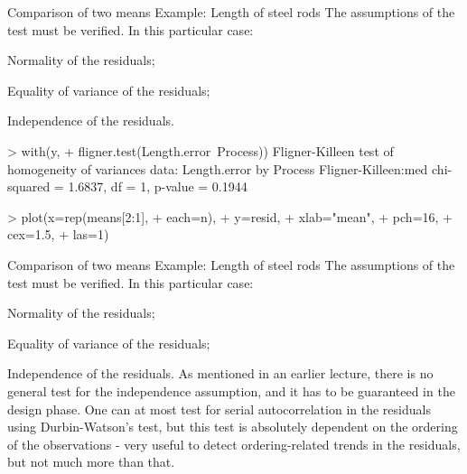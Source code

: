 \documentclass[t]{beamer}
\begin{document}
\begin{ftstf}
{Comparison of two means}
{Example: Length of steel rods}
The assumptions of the test must be verified. In this particular case:

\bitems Normality of the residuals;
\item \alert{Equality of variance of the residuals};
\item Independence of the residuals.
\eitem
\begin{rcode}
> with(y,
+      fligner.test(Length.error~Process))
Fligner-Killeen test of homogeneity of variances
data:  Length.error by Process
Fligner-Killeen:med chi-squared = 1.6837, 
df = 1, p-value = 0.1944

> plot(x=rep(means[2:1],
+            each=n),
+      y=resid,
+      xlab="mean",
+      pch=16,
+      cex=1.5,
+      las=1)
\end{rcode}
\end{ftstf}


\begin{ftst}
{Comparison of two means}
{Example: Length of steel rods}
The assumptions of the test must be verified. In this particular case:

\bitems Normality of the residuals;
\item Equality of variance of the residuals;
\item \alert{Independence of the residuals}.
\eitem
As mentioned in an earlier lecture, there is no general test for the independence assumption, and it has to be guaranteed in the design phase. 
\vhalf
One can at most test for serial autocorrelation in the residuals using Durbin-Watson's test, but this test is absolutely dependent on the ordering of the observations - very useful to detect ordering-related trends in the residuals, but not much more than that.
\end{ftst}
\end{document}
